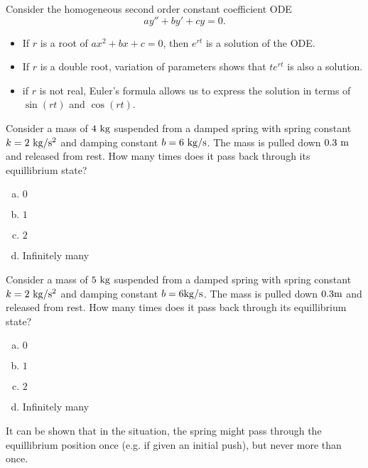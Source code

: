 
\begin{applicationActivities}

\begin{observation}
Consider the homogeneous second order constant coefficient ODE \[ay''+by'+cy=0.\]
\vfill
\begin{itemize}
\item If \(r\) is a root of \(ax^2+bx+c=0\), then \(e^{rt}\) is a solution of the ODE.
\item If \(r\) is a double root, variation of parameters shows that \(te^{rt}\) is also a solution.
\item if \(r\) is not real, Euler's formula allows us to express the solution in terms of \(\sin(rt)\) and \(\cos(rt)\).
\end{itemize}
\end{observation}

\begin{activity}{15}
Consider a mass of \(4\ {\rm kg}\) suspended from a damped spring with spring constant \(k=2\ {\rm kg/s^2}\) and damping constant \(b= 6\ {\rm kg/s}\).  
\vfill
The mass is pulled down \(0.3\ {\rm m}\) and released from rest.  How many times does it pass back through its equillibrium state?
\vfill
\begin{enumerate}[(a)]
\item \(0\)
\item \(1\)
\item \(2\)
\item Infinitely many
\end{enumerate}
\end{activity}

\begin{activity}{15}
Consider a mass of \(5\ {\rm kg}\) suspended from a damped spring with spring constant \(k=2\ {\rm kg/s^2}\) and damping constant \(b= 6{\rm kg/s}\).  
\vfill
The mass is pulled down \(0.3 {\rm m}\) and released from rest.  How many times does it pass back through its equillibrium state?
\vfill
\begin{enumerate}[(a)]
\item \(0\)
\item \(1\)
\item \(2\)
\item Infinitely many
\end{enumerate}
\end{activity}

\begin{observation}
It can be shown that in the  situation, the spring might pass through the equillibrium position once (e.g. if given an initial push), but never more than once.
\end{observation}


\end{applicationActivities}
